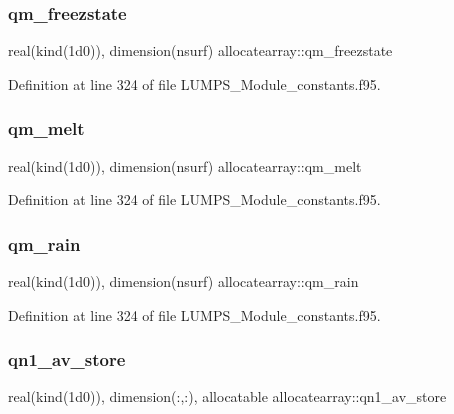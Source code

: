 \subsubsection{\texorpdfstring{qm\+\_\+freezstate}{qm\_freezstate}}
{\footnotesize\ttfamily real(kind(1d0)), dimension(nsurf) allocatearray\+::qm\+\_\+freezstate}



Definition at line 324 of file L\+U\+M\+P\+S\+\_\+\+Module\+\_\+constants.\+f95.

\mbox{\label{namespaceallocatearray_ad91b6e6a19469cd5c3a450fa56b031fa}} 
\subsubsection{\texorpdfstring{qm\+\_\+melt}{qm\_melt}}
{\footnotesize\ttfamily real(kind(1d0)), dimension(nsurf) allocatearray\+::qm\+\_\+melt}



Definition at line 324 of file L\+U\+M\+P\+S\+\_\+\+Module\+\_\+constants.\+f95.

\mbox{\label{namespaceallocatearray_af875c3c6d435a8f1c4c5590f22d5ac61}} 
\subsubsection{\texorpdfstring{qm\+\_\+rain}{qm\_rain}}
{\footnotesize\ttfamily real(kind(1d0)), dimension(nsurf) allocatearray\+::qm\+\_\+rain}



Definition at line 324 of file L\+U\+M\+P\+S\+\_\+\+Module\+\_\+constants.\+f95.

\mbox{\label{namespaceallocatearray_ad5f385f647d84ed863fbfe5ae0754b28}} 
\subsubsection{\texorpdfstring{qn1\+\_\+av\+\_\+store}{qn1\_av\_store}}
{\footnotesize\ttfamily real(kind(1d0)), dimension(\+:,\+:), allocatable allocatearray\+::qn1\+\_\+av\+\_\+store}



